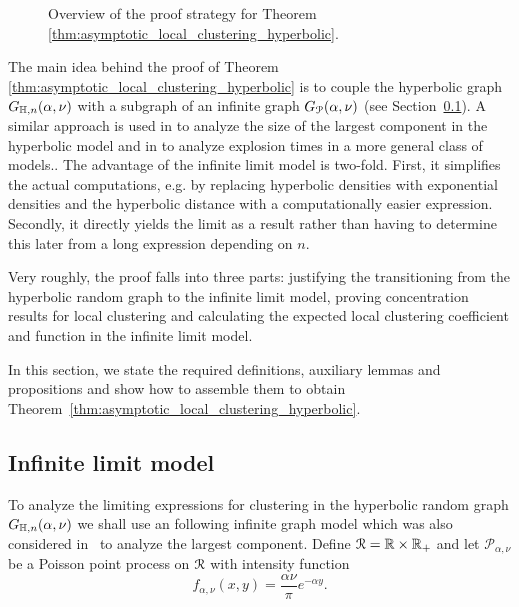 \begin{figure}[!t]

\caption{Overview of the proof strategy for Theorem \ref{thm:asymptotic_local_clustering_hyperbolic}.}
\label{fig:overview_proof}
\end{figure}

The main idea behind the proof of Theorem \ref{thm:asymptotic_local_clustering_hyperbolic} is to couple the hyperbolic graph $G_{\mathbb{H}, n}(\alpha, \nu)$ with a subgraph of an infinite graph $G_{{\mathcal P}}(\alpha,\nu)$ (see Section~\ref{ssec:infinite_model}). A similar approach is used in \cite{fountoulakis2018law} to analyze the size of the largest component in the hyperbolic model and in \cite{komjathy2018explosion} to analyze explosion times in a more general class of models.. 
The advantage of the infinite limit model is two-fold. First, it simplifies the actual computations, e.g. by replacing hyperbolic densities with exponential densities and the hyperbolic distance with a computationally easier expression. Secondly, it directly yields the limit as a result rather than having to determine this later from a long expression depending on $n$. 

Very roughly, the proof falls into three parts: justifying the transitioning from the hyperbolic random graph to the infinite limit model, proving concentration results for local clustering and calculating the expected local clustering coefficient and function in the infinite limit model.
	
In this section, we state the required definitions, auxiliary lemmas and propositions and show how to assemble them to obtain Theorem~\ref{thm:asymptotic_local_clustering_hyperbolic}.

\subsection{Infinite limit model}\label{ssec:infinite_model}

To analyze the limiting expressions for clustering in the hyperbolic random graph $G_{\mathbb{H},n}(\alpha, \nu)$ we shall use an following infinite graph model which was also considered in~\cite{fountoulakis2018law} to analyze the largest component. Define ${\mathcal R} = \mathbb{R} \times \mathbb{R}_+$ and let $\mathcal{P}_{\alpha,\nu}$ be a Poisson point process on ${\mathcal R}$ with intensity function
\begin{equation}\label{eq:def_intensity_function_f}
	f_{\alpha,\nu}(x,y) = \frac{\alpha \nu}{\pi} e^{-\alpha y}.
\end{equation} 

